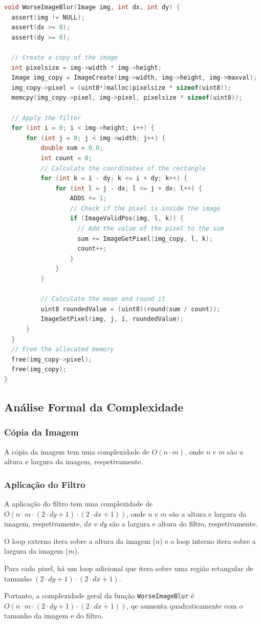 \documentclass{report}
\begin{document}
\begingroup
\begin{lstlisting}[language=C]
void WorseImageBlur(Image img, int dx, int dy) {
  assert(img != NULL);
  assert(dx >= 0);
  assert(dy >= 0);
  
  // Create a copy of the image
  int pixelsize = img->width * img->height;
  Image img_copy = ImageCreate(img->width, img->height, img->maxval);
  img_copy->pixel = (uint8*)malloc(pixelsize * sizeof(uint8));
  memcpy(img_copy->pixel, img->pixel, pixelsize * sizeof(uint8));
  
  // Apply the filter
  for (int i = 0; i < img->height; i++) {
      for (int j = 0; j < img->width; j++) {
          double sum = 0.0;
          int count = 0;
          // Calculate the coordinates of the rectangle
          for (int k = i - dy; k <= i + dy; k++) {
              for (int l = j - dx; l <= j + dx; l++) {
                  ADDS += 1;
                  // Check if the pixel is inside the image
                  if (ImageValidPos(img, l, k)) {
                    // Add the value of the pixel to the sum
                    sum += ImageGetPixel(img_copy, l, k);
                    count++;
                  }
              }
          }

          // Calculate the mean and round it
          uint8 roundedValue = (uint8)(round(sum / count));
          ImageSetPixel(img, j, i, roundedValue);
      }
  }
  // Free the allocated memory
  free(img_copy->pixel);
  free(img_copy);
}
\end{lstlisting}
\endgroup

\subsection{Análise Formal da Complexidade}

\subsubsection{Cópia da Imagem}
A cópia da imagem tem uma complexidade de \(O(n \cdot m)\), onde \(n\) e \(m\) são a altura e largura da imagem, respetivamente.

\subsubsection{Aplicação do Filtro}
A aplicação do filtro tem uma complexidade de \(O(n \cdot m \cdot (2 \cdot dy + 1) \cdot (2 \cdot dx + 1))\), 
onde \(n\) e \(m\) são a altura e largura da imagem, respetivamente, 
\(dx\) e \(dy\) são a largura e altura do filtro, respetivamente.
\par
O loop externo itera sobre a altura da imagem (\(n\)) e o loop interno itera sobre a largura da imagem (\(m\)).
\par
Para cada pixel, há um loop adicional que itera sobre uma região retangular de tamanho \((2 \cdot dy + 1) \cdot (2 \cdot dx + 1)\).
\par
Portanto, a complexidade geral da função \texttt{WorseImageBlur} é \(O(n \cdot m \cdot (2 \cdot dy + 1) \cdot (2 \cdot dx + 1))\), 
qe aumenta quadraticamente com o tamanho da imagem e do filtro.
\end{document}
